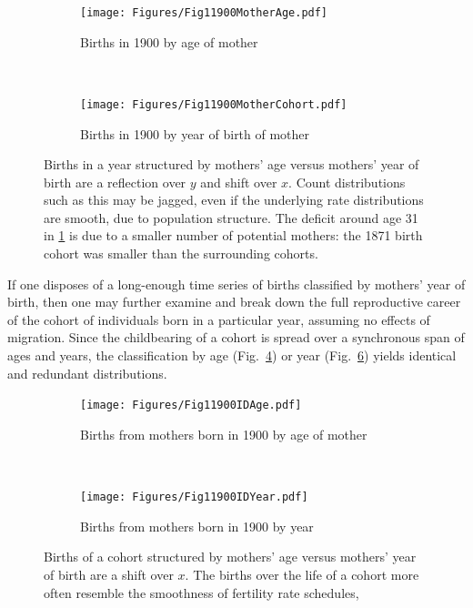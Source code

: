 \documentclass{article}
\begin{document}
\begin{figure}[ht!]
\begin{subfigure}[t]{0.5\textwidth}
        \centering
        \texttt{[image: Figures/Fig11900MotherAge.pdf]}
        \caption{Births in 1900 by age of mother}
        \label{fig:agemother}
\end{subfigure}
~
\begin{subfigure}[t]{0.5\textwidth}
        \centering
        \texttt{[image: Figures/Fig11900MotherCohort.pdf]}
        \caption{Births in 1900 by year of birth of mother}
          \label{fig:cohmother}
\end{subfigure}
\caption{Births in a year structured by mothers' age versus mothers' year of birth are a
reflection over $y$ and shift over $x$. Count distributions such as this may be jagged, even if the underlying rate distributions are smooth, due to population structure. The deficit around age 31 in \ref{fig:agemother} is due to a smaller number of potential mothers: the 1871 birth cohort was smaller than the surrounding cohorts.}
\end{figure}

If one disposes of a long-enough time series of births classified by mothers' year of birth, then one may further examine and break down the full reproductive career of the cohort of individuals born in a particular year, assuming no effects of migration. Since the childbearing of a cohort is spread over a synchronous span of ages and years, the classification by age (Fig.~\ref{fig:age1900mother}) or year (Fig.~\ref{fig:year1900}) yields identical and redundant distributions.

\begin{figure}[ht!]
\begin{subfigure}[t]{0.5\textwidth}
        \centering
        \texttt{[image: Figures/Fig11900IDAge.pdf]}
        \caption{Births from mothers born in 1900 by age of mother}
        \label{fig:age1900mother}
\end{subfigure}
~
\begin{subfigure}[t]{0.5\textwidth}
        \centering
        \texttt{[image: Figures/Fig11900IDYear.pdf]}
        \caption{Births from mothers born in 1900 by year}
          \label{fig:year1900}
\end{subfigure}
\caption{Births of a cohort structured by mothers' age versus mothers' year of birth are a
shift over $x$. The births over the life of a cohort more often resemble the smoothness of fertility rate schedules,}
\end{figure}
\end{document}
